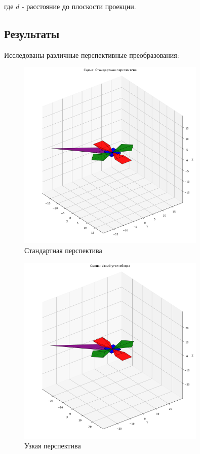 где $d$ - расстояние до плоскости проекции.

\subsection*{Результаты}
Исследованы различные перспективные преобразования:

\begin{figure}[H]
\centering
\includegraphics[width=0.8\textwidth]{images/task7/perspective_standard.png}
\caption{Стандартная перспектива}
\end{figure}

\begin{figure}[H]
\centering
\includegraphics[width=0.8\textwidth]{images/task7/perspective_narrow.png}
\caption{Узкая перспектива}
\end{figure}

